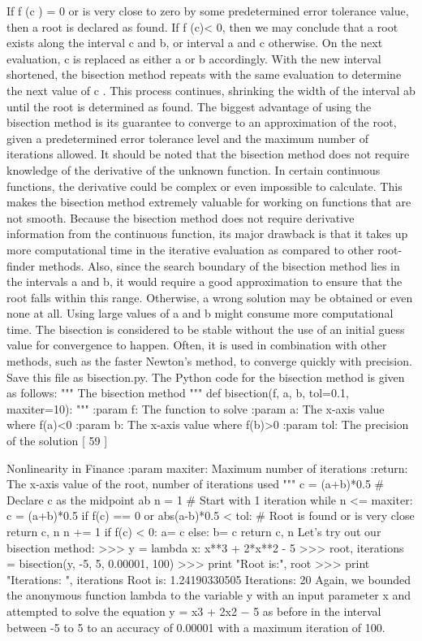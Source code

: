 If f (c ) = 0 or is very close to zero by some predetermined error tolerance value, then a root is declared as found. If f (c)< 0, then we may conclude that a root exists along the interval c and b, or interval a and c otherwise.
On the next evaluation, c is replaced as either a or b accordingly. With the new interval shortened, the bisection method repeats with the same evaluation to determine the next value of c . This process continues, shrinking the width of the interval ab until the root is determined as found.
The biggest advantage of using the bisection method is its guarantee to converge to an approximation of the root, given a predetermined error tolerance level and the maximum number of iterations allowed. It should be noted that the bisection method does not require knowledge of the derivative of the unknown function. In certain continuous functions, the derivative could be complex or even impossible to calculate. This makes the bisection method extremely valuable for working on functions that are not smooth.
Because the bisection method does not require derivative information from the continuous function, its major drawback is that it takes up more computational
time in the iterative evaluation as compared to other root-finder methods. Also, since the search boundary of the bisection method lies in the intervals a and b, it would require a good approximation to ensure that the root falls within this range. Otherwise, a wrong solution may be obtained or even none at all. Using large values of a and b might consume more computational time.
The bisection is considered to be stable without the use of an initial guess value for convergence to happen. Often, it is used in combination with other methods, such as the faster Newton's method, to converge quickly with precision.
Save this file as bisection.py. The Python code for the bisection method is given as follows:
""" The bisection method """
def bisection(f, a, b, tol=0.1, maxiter=10): """
:param f: The function to solve
:param a: The x-axis value where f(a)<0 :param b: The x-axis value where f(b)>0 :param tol: The precision of the solution
[ 59 ]

Nonlinearity in Finance
:param maxiter: Maximum number of iterations :return: The x-axis value of the root,
number of iterations used
"""
c = (a+b)*0.5 # Declare c as the midpoint ab n = 1 # Start with 1 iteration
while n <= maxiter:
c = (a+b)*0.5
if f(c) == 0 or abs(a-b)*0.5 < tol:
# Root is found or is very close return c, n
n += 1
if f(c) < 0:
a= c else:
b= c
return c, n
Let's try out our bisection method:
>>> y = lambda x: x**3 + 2*x**2 - 5
>>> root, iterations = bisection(y, -5, 5, 0.00001, 100) >>> print "Root is:", root
>>> print "Iterations: ", iterations
Root is: 1.24190330505
Iterations: 20
Again, we bounded the anonymous function lambda to the variable y with an input parameter x and attempted to solve the equation y = x3 + 2x2 − 5 as before in the interval between -5 to 5 to an accuracy of 0.00001 with a maximum iteration of 100.



